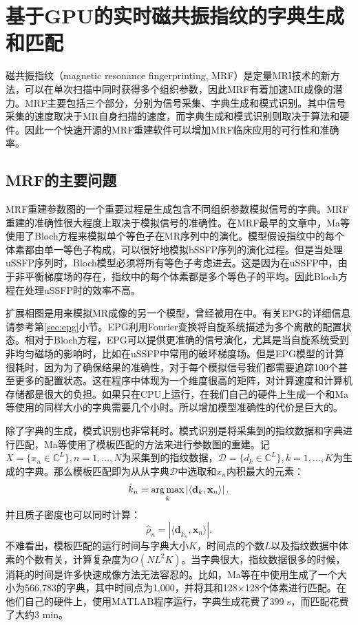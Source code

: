 \chapter{基于GPU的实时磁共振指纹的字典生成和匹配}
\label{chap:snapMRF}
磁共振指纹（magnetic resonance fingerprinting, MRF）是定量MRI技术的新方法，可以在单次扫描中同时获得多个组织参数\cite{mrf,esr,bipin_mehta_magnetic_2019}，因此MRF有着加速MR成像的潜力。MRF主要包括三个部分，分别为信号采集、字典生成和模式识别。其中信号采集的速度取决于MR自身扫描的速度，而字典生成和模式识别则取决于算法和硬件。因此一个快速开源的MRF重建软件可以增加MRF临床应用的可行性和准确率。

\section{MRF的主要问题}
MRF重建参数图的一个重要过程是生成包含不同组织参数模拟信号的字典。MRF重建的准确性很大程度上取决于模拟信号的准确性。在MRF最早的文章中，Ma等\cite{mrf}使用了Bloch方程来模拟单个等色子在MR序列中的演化。模型假设指纹中的每个体素都由单一等色子构成，可以很好地模拟bSSFP序列的演化过程。但是当处理uSSFP序列时，Bloch模型必须将所有等色子考虑进去。这是因为在uSSFP中，由于非平衡梯度场的存在，指纹中的每个体素都是多个等色子的平均。因此Bloch方程在处理uSSFP时的效率不高。

扩展相图是用来模拟MR成像的另一个模型，曾经被用在\cite{jiang}中。有关EPG的详细信息请参考第\ref{sec:epg}小节。EPG利用Fourier变换将自旋系统描述为多个离散的配置状态。相对于Bloch方程，EPG可以提供更准确的信号演化，尤其是当自旋系统受到非均匀磁场的影响时，比如在uSSFP中常用的破坏梯度场。但是EPG模型的计算很耗时，因为为了确保结果的准确性，对于每个模拟信号我们都需要追踪100个甚至更多的配置状态。这在程序中体现为一个维度很高的矩阵，对计算速度和计算机存储都是很大的负担。如果只在CPU上运行，在我们自己的硬件上生成一个和Ma等\cite{mrf}使用的同样大小的字典需要几个小时。所以增加模型准确性的代价是巨大的。

除了字典的生成，模式识别也非常耗时。模式识别是将采集到的指纹数据和字典进行匹配，Ma等\cite{mrf}使用了模板匹配的方法来进行参数图的重建。记$X=\{x_n\in \mathbb{C}^L\}, n=1,...,N$为采集到的指纹数据，$\mathcal{D}=\{d_k\in \mathbb{C}^L\},k=1,...,K$为生成的字典。那么模板匹配即为从从字典$\mathcal{D}$中选取和$x_n$内积最大的元素：
	\begin{equation}
	\hat{k}_n = \operatorname*{arg\,max}_k \left|\left\langle \mathbf{d}_k,\mathbf{x}_n \right\rangle \right|.
	\end{equation}
并且质子密度也可以同时计算：
	\begin{equation}
	\hat{\rho}_n=\left|\langle \mathbf{d}_{\hat{k}_n},\mathbf{x}_n \rangle\right|.
	\end{equation}
不难看出，模板匹配的运行时间与字典大小$K$，时间点的个数$L$以及指纹数据中体素的个数有关，计算复杂度为$O(NL^2K)$。当字典很大，指纹数据很多的时候，消耗的时间是许多快速成像方法无法容忍的。比如，Ma等在\cite{mrf}中使用生成了一个大小为566,783的字典，其中时间点为1,000，并将其和128$\times$128个体素进行匹配。在他们自己的硬件上，使用MATLAB程序运行，字典生成花费了399 s，而匹配花费了大约3 min。

